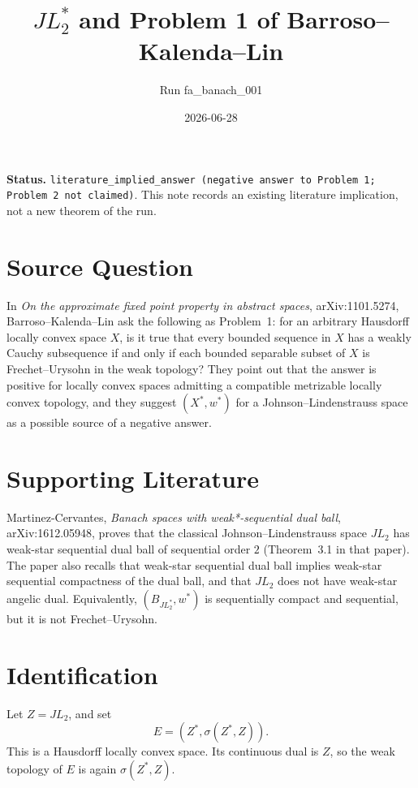 \documentclass[11pt]{amsart}
\begin{document}
\title{\(JL_2^*\) and Problem 1 of Barroso--Kalenda--Lin}
\author{Run fa\_banach\_001}
\date{2026-06-28}
\maketitle

\noindent
\textbf{Status.}
\texttt{literature\_implied\_answer (negative answer to Problem 1; Problem 2 not claimed)}.
This note records an existing literature implication, not a new theorem of the
run.

\section*{Source Question}

In \emph{On the approximate fixed point property in abstract spaces},
arXiv:1101.5274, Barroso--Kalenda--Lin ask the following as Problem~1:
for an arbitrary Hausdorff locally convex space \(X\), is it true that every
bounded sequence in \(X\) has a weakly Cauchy subsequence if and only if each
bounded separable subset of \(X\) is Frechet--Urysohn in the weak topology?
They point out that the answer is positive for locally convex spaces admitting
a compatible metrizable locally convex topology, and they suggest
\((X^*,w^*)\) for a Johnson--Lindenstrauss space as a possible source of a
negative answer.

\section*{Supporting Literature}

Martinez-Cervantes, \emph{Banach spaces with weak*-sequential dual ball},
arXiv:1612.05948, proves that the classical Johnson--Lindenstrauss space
\(JL_2\) has weak-star sequential dual ball of sequential order \(2\)
(Theorem~3.1 in that paper). The paper also recalls that weak-star
sequential dual ball implies weak-star sequential compactness of the dual
ball, and that \(JL_2\) does not have weak-star angelic dual. Equivalently,
\((B_{JL_2^*},w^*)\) is sequentially compact and sequential, but it is not
Frechet--Urysohn.

\section*{Identification}

Let \(Z=JL_2\), and set
\[
  E=(Z^*,\sigma(Z^*,Z)).
\]
This is a Hausdorff locally convex space. Its continuous dual is \(Z\), so the
weak topology of \(E\) is again \(\sigma(Z^*,Z)\).
\end{document}
